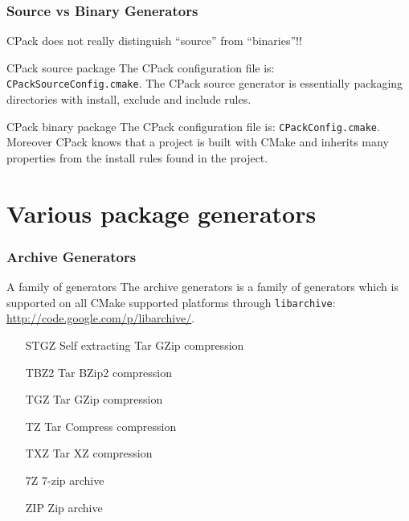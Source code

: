 \documentclass[compress,slidestop,table
              ]
               {beamer}
\newcommand{\fname}[1]{\texttt{#1}}
\begin{document}
\begin{frame}[label=cpackworkflow]
\end{frame}

\begin{frame}
\frametitle{Source vs Binary Generators}
\alert{CPack does not really distinguish ``source'' from ``binaries''!!}
\begin{block}{CPack source package}
The CPack configuration file is: \fname{CPackSourceConfig.cmake}.
The CPack source generator is essentially packaging directories with
install, exclude and include rules.
\end{block}
\begin{block}{CPack binary package}
The CPack configuration file is: \fname{CPackConfig.cmake}.
Moreover CPack knows that a project is built with CMake and
inherits many properties from the install rules found in
the project.
\end{block}

\end{frame}

\section{Various package generators}
\begin{frame}
\frametitle{Archive Generators}
\begin{block}{A family of generators}
The archive generators is a family of generators which is supported
on all CMake supported platforms through \fname{libarchive}:
\url{http://code.google.com/p/libarchive/}.
\end{block}
\begin{itemize}
\item[STGZ] Self extracting Tar GZip compression
\item[TBZ2] Tar BZip2 compression
\item[TGZ]  Tar GZip compression
\item[TZ]   Tar Compress compression
\item[TXZ]  Tar XZ compression
\item[7Z]   7-zip archive
\item[ZIP]  Zip archive
\end{itemize}
\end{frame}
\end{document}
